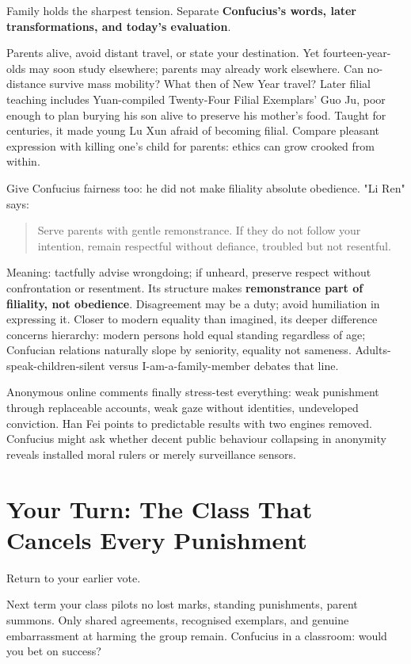 Family holds the sharpest tension. Separate \textbf{Confucius's words, later transformations, and today's evaluation}.

Parents alive, avoid distant travel, or state your destination. Yet fourteen-year-olds may soon study elsewhere; parents may already work elsewhere. Can no-distance survive mass mobility? What then of New Year travel? Later filial teaching includes Yuan-compiled Twenty-Four Filial Exemplars' Guo Ju, poor enough to plan burying his son alive to preserve his mother's food. Taught for centuries, it made young Lu Xun afraid of becoming filial. Compare pleasant expression with killing one's child for parents: ethics can grow crooked from within.

Give Confucius fairness too: he did not make filiality absolute obedience. "Li Ren" says:

\begin{quote}
Serve parents with gentle remonstrance. If they do not follow your intention, remain respectful without defiance, troubled but not resentful.
\end{quote}
Meaning: tactfully advise wrongdoing; if unheard, preserve respect without confrontation or resentment. Its structure makes \textbf{remonstrance part of filiality, not obedience}. Disagreement may be a duty; avoid humiliation in expressing it. Closer to modern equality than imagined, its deeper difference concerns hierarchy: modern persons hold equal standing regardless of age; Confucian relations naturally slope by seniority, equality not sameness. Adults-speak-children-silent versus I-am-a-family-member debates that line.

Anonymous online comments finally stress-test everything: weak punishment through replaceable accounts, weak gaze without identities, undeveloped conviction. Han Fei points to predictable results with two engines removed. Confucius might ask whether decent public behaviour collapsing in anonymity reveals installed moral rulers or merely surveillance sensors.

\section[Your Turn: A Class without Penalties]{Your Turn: The Class That Cancels Every Punishment}
Return to your earlier vote.

Next term your class pilots no lost marks, standing punishments, parent summons. Only shared agreements, recognised exemplars, and genuine embarrassment at harming the group remain. Confucius in a classroom: would you bet on success?

